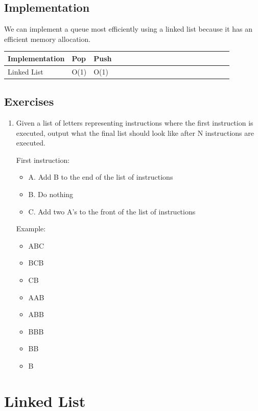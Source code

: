 \documentclass[11pt,oneside]{book}
\begin{document}
\subsection{Implementation}

We can implement a queue most efficiently using a linked list because it has an efficient memory allocation.

\vspace{10pt} \begin{tabulary}{0.4\linewidth}{|l|l|l|l|l|l|l|l|l|l|l|l|l|l|l|l|l|l|l}\hline


  Implementation &
  Pop &
  Push\\
\hline


  Linked List &
  O(1) &
  O(1)\\

\hline\end{tabulary}

\subsection{Exercises}

\begin{enumerate}
\item Given a list of letters representing instructions where the first instruction is executed, output what the final list should look like after N instructions are executed.

First instruction:

\begin{itemize}
\item A. Add B to the end of the list of instructions
\item B. Do nothing
\item C. Add two A's to the front of the list of instructions
\end{itemize}

Example:

\begin{itemize}
\item ABC
\item BCB
\item CB
\item AAB
\item ABB
\item BBB
\item BB
\item B
\end{itemize}
\end{enumerate}

        \section{ Linked List }
        
\end{document}
